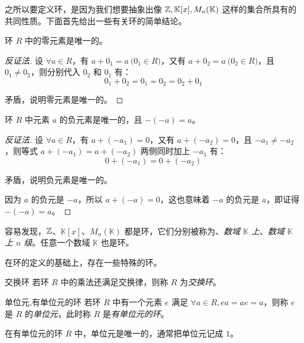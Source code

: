 之所以要定义环，是因为我们想要抽象出像 $\mathbb Z, \mathbb K[x], M_n(\mathbb K)$ 这样的集合所具有的共同性质。下面首先给出一些有关环的简单结论。

\begin{proposition}
	环 $R$ 中的零元素是唯一的。
\end{proposition}

\begin{proof}[反证法]
	设 $\forall a \in R$，有 $a + 0_1 = a \pod{0_1 \in R}$，又有 $a + 0_2 = a \pod{0_2 \in R}$，且 $0_1 \ne 0_2$，则分别代入 $0_2$ 和 $0_1$ 有：
	$$
	0_1 + 0_2 = 0_1 = 0_2 = 0_2 + 0_1
	$$

	矛盾，说明零元素是唯一的。
\end{proof}

\begin{theorem}
	环 $R$ 中元素 $a$ 的负元素是唯一的，且 $-(-a) = a$。
\end{theorem}

\begin{proof}[反证法]
	设 $\forall a \in R$，有 $a + (-a_1) = 0$，又有 $a + (-a_2) = 0$，且 $-a_1 \ne -a_2$，则等式 $a + (-a_1) = a + (-a_2)$ 两侧同时加上 $-a_1$ 有：
	$$
	0 + (-a_1) = 0 + (-a_2)
	$$

	矛盾，说明负元素是唯一的。

	\bigskip

	因为 $a$ 的负元是 $-a$，所以 $a + (-a) = 0$，这也意味着 $-a$ 的负元是 $a$，即证得 $-(-a) = a$。
\end{proof}

容易发现，$\mathbb Z$、$\mathbb K[x]$、$M_n(\mathbb K)$ 都是环，它们分别被称为\emph{}、\emph{数域 $\mathbb K$ 上}、\emph{数域 $\mathbb K$ 上 $n$ 级}。任意一个数域 $\mathbb K$ 也是环。

\bigskip

在环的定义的基础上，存在一些特殊的环。

\begin{definition}{交换环}
	若环 $R$ 中的乘法还满足交换律，则称 $R$ 为\emph{交换环}。
\end{definition}

\begin{definition}{单位元,有单位元的环}
	若环 $R$ 中有一个元素 $e$ 满足 $\forall a \in R, ea = ae = a$，则称 $e$ 是 $R$ 的\emph{单位元}，此时称 $R$ 是\emph{有单位元的环}。
\end{definition}

\begin{proposition}
	在有单位元的环 $R$ 中，单位元是唯一的，通常把单位元记成 $1$。
\end{proposition}

